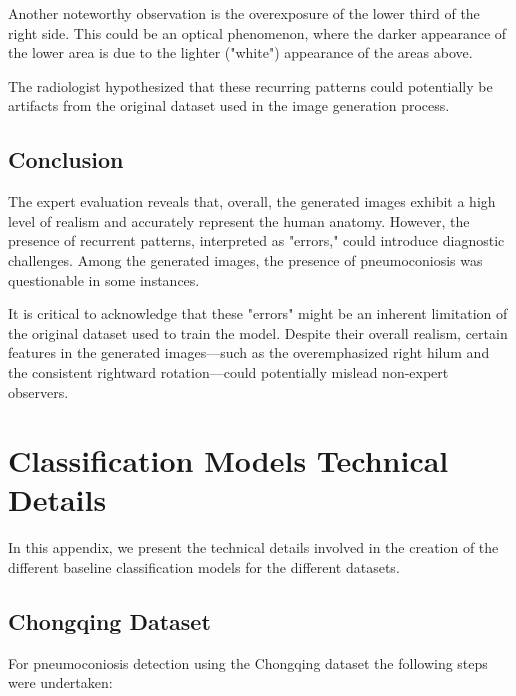 Another noteworthy observation is the overexposure of the lower third of the right side. This could be an optical phenomenon, where the darker appearance of the lower area is due to the lighter ("white") appearance of the areas above.

The radiologist hypothesized that these recurring patterns could potentially be artifacts from the original dataset used in the image generation process.

\subsection{Conclusion}

The expert evaluation reveals that, overall, the generated images exhibit a high level of realism and accurately represent the human anatomy. However, the presence of recurrent patterns, interpreted as "errors," could introduce diagnostic challenges. Among the generated images, the presence of pneumoconiosis was questionable in some instances.

It is critical to acknowledge that these "errors" might be an inherent limitation of the original dataset used to train the model. Despite their overall realism, certain features in the generated images—such as the overemphasized right hilum and the consistent rightward rotation—could potentially mislead non-expert observers.

\section{Classification Models Technical Details}
\label{app:technical_details}

In this appendix, we present the technical details involved in the creation of the different baseline classification models for the different datasets.

\subsection{Chongqing Dataset}

For pneumoconiosis detection using the Chongqing dataset the following steps were undertaken:

